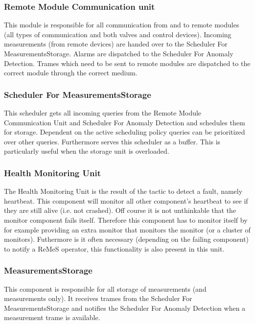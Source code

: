 \subsubsection{Remote Module Communication unit}

\npar This module is responsible for all communication from and to remote
modules (all types of communication and both valves and control devices).
Incoming measurements (from remote devices) are handed over to the Scheduler For
MeasurementsStorage. Alarms are dispatched to the Scheduler For Anomaly
Detection. Trames which need to be sent to remote modules are dispatched to the
correct module through the correct medium.

\subsubsection{Scheduler For MeasurementsStorage}

\npar This scheduler gets all incoming queries from the Remote Module
Communication Unit and Scheduler For Anomaly Detection and schedules them for
storage. Dependent on the active scheduling policy queries can be prioritized
over other queries. Furthermore serves this scheduler as a buffer. This is
particularly useful when the storage unit is overloaded.

\subsubsection{Health Monitoring Unit}

\npar The Health Monitoring Unit is the result of the tactic to detect a
fault, namely heartbeat. This component will monitor all other component's
heartbeat to see if they are still alive (i.e. not crashed). Off course it is
not unthinkable that the monitor component fails itself. Therefore this
component has to monitor itself by for example providing an extra monitor that
monitors the monitor (or a cluster of monitors). Futhermore is it often
necessary (depending on the failing component) to notify a ReMeS operator, this
functionality is also present in this unit.

\subsubsection{MeasurementsStorage}

\npar This component is responsible for all storage of measurements (and
measurements only). It receives trames from the Scheduler For
MeasurementsStorage and notifies the Scheduler For Anomaly Detection when a
measurement trame is available.

